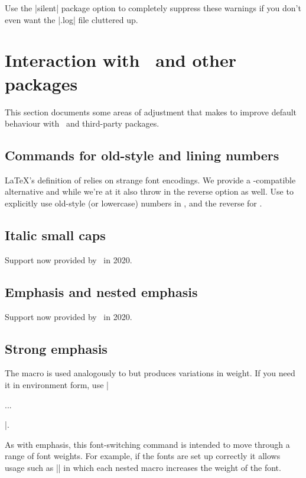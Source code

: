 \documentclass[a4paper]{l3doc}
\begin{document}
Use the |silent| package option to completely suppress these warnings if you
don't even want the |.log| file cluttered up.



\section{Interaction with \LaTeXe\ and other packages}

This section documents some areas of adjustment that  makes
to improve default behaviour with \LaTeXe\ and third-party packages.



\subsection{Commands for old-style and lining numbers}

\DescribeMacro{\oldstylenums}
\DescribeMacro{\liningnums}
\LaTeX's definition of  relies on strange font encodings.
We provide a -compatible alternative and while we're at it
also throw in the reverse option as well. Use 
to explicitly use old-style (or lowercase) numbers in , and
the reverse for .


\subsection{Italic small caps}

Support now provided by \LaTeXe\ in 2020.


\subsection{Emphasis and nested emphasis}

Support now provided by \LaTeXe\ in 2020.


\subsection{Strong emphasis}

\DescribeMacro{\strong}
\DescribeMacro{\strongenv}
The  macro is used analogously to  but produces variations in weight.
If you need it in environment form, use |\begin{strongenv}...\end{strongenv}|.

As with emphasis, this font-switching command is intended to move through a range
of font weights. For example, if the fonts are set up correctly it allows usage such as
|| in which each nested  macro increases the
weight of the font.
\end{document}
